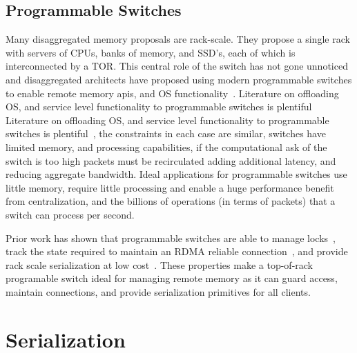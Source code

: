 

\subsection{Programmable Switches}
Many disaggregated memory proposals are rack-scale. They
propose a single rack with servers of CPUs, banks of memory,
and SSD's, each of which is interconnected by a TOR. This
central role of the switch has not gone unnoticed and
disaggregated architects have proposed using modern
programmable switches to enable remote memory apis, and OS
functionality~\cite{disandapp,mind}. Literature on
offloading OS, and service level functionality to
programmable switches is plentiful Literature on offloading
OS, and service level functionality to programmable switches
is plentiful~\cite{netlock,netkv,netchain,netcache}, the
constraints in each case are similar, switches have limited
memory, and processing capabilities, if the computational
ask of the switch is too high packets must be recirculated
adding additional latency, and reducing aggregate bandwidth.
Ideal applications for programmable switches use little
memory, require little processing and enable a huge
performance benefit from centralization, and the billions of
operations (in terms of packets) that a switch can process
per second.

Prior work has shown that programmable switches are able to
manage locks~\cite{netlock}, track the state required to
maintain an RDMA reliable connection~\cite{tea}, and provide
rack scale serialization at low
cost~\cite{eris,no,when-computer}. These properties make a
top-of-rack programable switch ideal for managing remote
memory as it can guard access, maintain connections, and
provide serialization primitives for all clients.


\section{Serialization}

